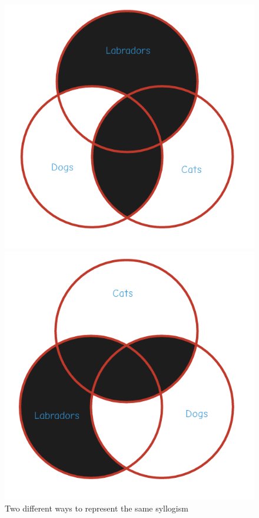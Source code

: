 \documentclass[12pt,a4paper]{report}
\begin{document}
\begin{figure}[!h]
  \centering
  \begin{minipage}[b]{0.4\textwidth}
    \includegraphics[width=\textwidth]{Labrador1}
  \end{minipage}
  \hfill
  \begin{minipage}[b]{0.4\textwidth}
    \includegraphics[width=\textwidth]{Labrador2}
  \end{minipage}
  \caption{Two different ways to represent the same syllogism}
\end{figure}
\FloatBarrier
\end{document}
